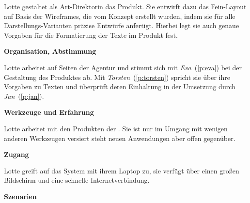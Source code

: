 \begin{multicols}{2}

\begin{center}
\end{center}


Lotte gestaltet als Art-Direktorin das Produkt. Sie entwirft dazu das Fein-Layout auf Basis der Wireframes, die vom Konzept erstellt wurden, indem sie für alle Darstellungs-Varianten präzise Entwürfe anfertigt. Hierbei legt sie auch genaue Vorgaben für die Formatierung der Texte im Produkt fest.

\textbf{Organisation, Abstimmung}

Lotte arbeitet auf Seiten der Agentur und stimmt sich mit \emph{Eva}~(\ref{p:eva}) bei der Gestaltung des Produktes ab. Mit \emph{Torsten}~(\ref{p:torsten}) spricht sie über ihre Vorgaben zu Texten und überprüft deren Einhaltung in der Umsetzung durch \emph{Jan}~(\ref{p:jan}).

\textbf{Werkzeuge und Erfahrung}

Lotte arbeitet mit den Produkten der . Sie ist nur im Umgang mit wenigen anderen Werkzeugen versiert steht neuen Anwendungen aber offen gegenüber.

\textbf{Zugang}

Lotte greift auf das System mit ihrem Laptop zu, sie verfügt über einen großen Bildschirm und eine schnelle Internetverbindung.

\columnbreak

\textbf{Szenarien}


\end{multicols}
